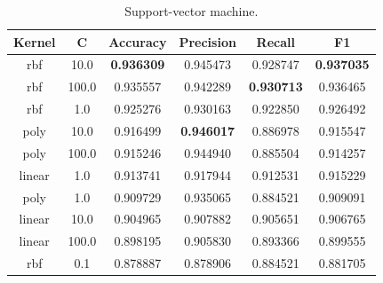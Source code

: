 \begin{appendices}
\begin{table}[ht]
\bigskip
\begin{subtable}{\textwidth}
\begin{adjustbox}{minipage=18cm, center}
\centering
\begin{tabular*}{\textwidth}{c @{\extracolsep{\fill}} ccccc}
\toprule
 Kernel &      C &  Accuracy &  Precision &    Recall &        F1 \\
\midrule
    rbf &   10.0 & \textbf{0.936309} &   0.945473 &  0.928747 &  \textbf{0.937035} \\
    rbf &  100.0 &  0.935557 &   0.942289 &  \textbf{0.930713} &  0.936465 \\
    rbf &    1.0 &  0.925276 &   0.930163 &  0.922850 &  0.926492 \\
   poly &   10.0 &  0.916499 &   \textbf{0.946017} &  0.886978 &  0.915547 \\
   poly &  100.0 &  0.915246 &   0.944940 &  0.885504 &  0.914257 \\
 linear &    1.0 &  0.913741 &   0.917944 &  0.912531 &  0.915229 \\
   poly &    1.0 &  0.909729 &   0.935065 &  0.884521 &  0.909091 \\
 linear &   10.0 &  0.904965 &   0.907882 &  0.905651 &  0.906765 \\
 linear &  100.0 &  0.898195 &   0.905830 &  0.893366 &  0.899555 \\
    rbf &    0.1 &  0.878887 &   0.878906 &  0.884521 &  0.881705 \\
\bottomrule
\end{tabular*}
\caption{\label{tab:Support-vector machine}Support-vector machine.}
\end{adjustbox}
\end{subtable}



\end{table}
\end{appendices}
